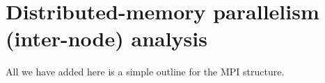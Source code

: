 \chapter{Distributed-memory parallelism (inter-node) analysis}
\label{chapter:node-level}


\begin{wip}
All we have added here is a simple outline for the MPI structure.
\end{wip}
















